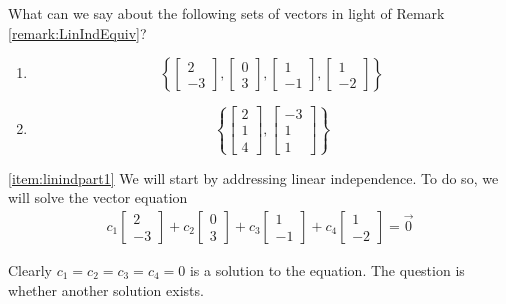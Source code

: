\documentclass{ximera}
\begin{document}
\begin{example}\label{ex:linind}What can we say about the following sets of vectors in light of Remark \ref{remark:LinIndEquiv}?

\begin{enumerate}
\item \label{item:linindpart1}
$$\left\{\begin{bmatrix}2\\-3\end{bmatrix}, \begin{bmatrix}0\\3\end{bmatrix},\begin{bmatrix}1\\-1\end{bmatrix},\begin{bmatrix}1\\-2\end{bmatrix}\right\}$$

\item \label{item:linindpart2} $$\left\{\begin{bmatrix}2\\1\\4\end{bmatrix},\begin{bmatrix}-3\\1\\1\end{bmatrix}\right\}$$
\end{enumerate}
\begin{explanation} \ref{item:linindpart1}
We will start by addressing linear independence.  To do so, we will solve the vector equation
\begin{align}\label{eq:linrelationpart1}c_1\begin{bmatrix}2\\-3\end{bmatrix}+c_2 \begin{bmatrix}0\\3\end{bmatrix}+c_3\begin{bmatrix}1\\-1\end{bmatrix}+c_4\begin{bmatrix}1\\-2\end{bmatrix}=\vec{0}\end{align}
 
 Clearly $c_1=c_2=c_3=c_4=0$ is a solution to the equation.  The question is whether another solution exists.
 

\end{explanation}
\end{example}
\end{document}
